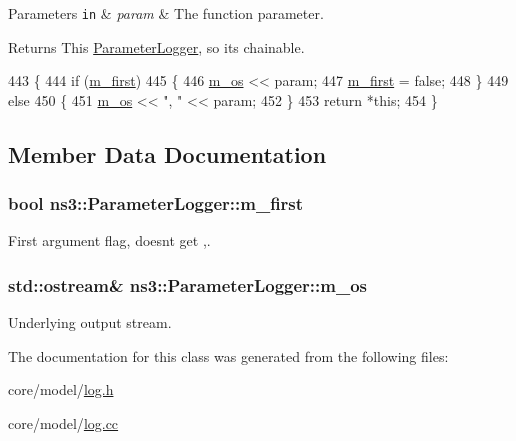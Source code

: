 \begin{DoxyParams}[1]{Parameters}
\mbox{\tt in}  & {\em param} & The function parameter. \\
\hline
\end{DoxyParams}
\begin{DoxyReturn}{Returns}
This \hyperlink{classns3_1_1ParameterLogger}{Parameter\+Logger}, so it\textquotesingle{}s chainable. 
\end{DoxyReturn}

\begin{DoxyCode}
443 \{
444   \textcolor{keywordflow}{if} (\hyperlink{classns3_1_1ParameterLogger_a3c5e0b667c7b3fcccd97859e12897db5}{m\_first})
445     \{
446       \hyperlink{classns3_1_1ParameterLogger_a9a3b6e8560a52ca48cd97f1e16696b43}{m\_os} << param;
447       \hyperlink{classns3_1_1ParameterLogger_a3c5e0b667c7b3fcccd97859e12897db5}{m\_first} = \textcolor{keyword}{false};
448     \}
449   \textcolor{keywordflow}{else}
450     \{
451       \hyperlink{classns3_1_1ParameterLogger_a9a3b6e8560a52ca48cd97f1e16696b43}{m\_os} << \textcolor{stringliteral}{", "} << param;
452     \}
453   \textcolor{keywordflow}{return} *\textcolor{keyword}{this};
454 \}
\end{DoxyCode}


\subsection{Member Data Documentation}
\subsubsection[{\texorpdfstring{m\+\_\+first}{m_first}}]{\setlength{\rightskip}{0pt plus 5cm}bool ns3\+::\+Parameter\+Logger\+::m\+\_\+first\hspace{0.3cm}{\ttfamily [private]}}\hypertarget{classns3_1_1ParameterLogger_a3c5e0b667c7b3fcccd97859e12897db5}{}\label{classns3_1_1ParameterLogger_a3c5e0b667c7b3fcccd97859e12897db5}


First argument flag, doesn\textquotesingle{}t get {\ttfamily ,}. 

\subsubsection[{\texorpdfstring{m\+\_\+os}{m_os}}]{\setlength{\rightskip}{0pt plus 5cm}std\+::ostream\& ns3\+::\+Parameter\+Logger\+::m\+\_\+os\hspace{0.3cm}{\ttfamily [private]}}\hypertarget{classns3_1_1ParameterLogger_a9a3b6e8560a52ca48cd97f1e16696b43}{}\label{classns3_1_1ParameterLogger_a9a3b6e8560a52ca48cd97f1e16696b43}


Underlying output stream. 



The documentation for this class was generated from the following files\+:\begin{DoxyCompactItemize}
\item 
core/model/\hyperlink{log_8h}{log.\+h}\item 
core/model/\hyperlink{log_8cc}{log.\+cc}\end{DoxyCompactItemize}
